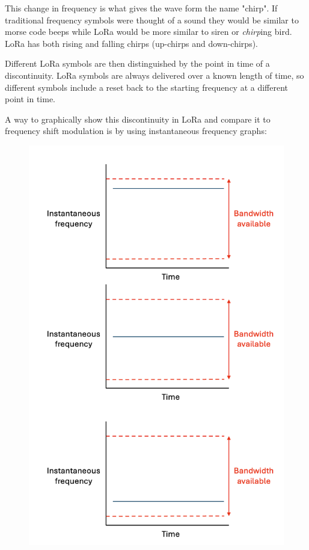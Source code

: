 This change in frequency is what gives the wave form the name "chirp". If
traditional frequency symbols were thought of a sound they would be similar to
morse code beeps while LoRa would be more similar to siren or \textit{chirp}ing
bird. LoRa has both rising and falling chirps (up-chirps and down-chirps).

Different LoRa symbols are then distinguished by the point in time of a
discontinuity. LoRa symbols are always delivered over a known length of time, so
different symbols include a reset back to the starting frequency at a different
point in time.

A way to graphically show this discontinuity in LoRa and compare it to frequency
shift modulation is by using instantaneous frequency graphs:

\begin{figure}[H]
  \centering
  \begin{minipage}{0.48\textwidth}
    \centering
    \includegraphics[width=0.9\linewidth]{contents/part-1/fig1/traditional-wavechart.png}

\end{minipage}
\end{figure}

